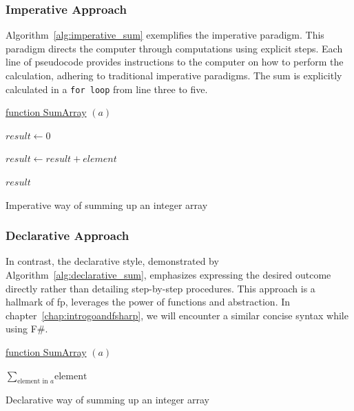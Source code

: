     \subsubsection{Imperative Approach}
    Algorithm\ \ref{alg:imperative_sum} exemplifies the imperative paradigm. This paradigm directs the computer through computations using explicit steps. Each line of pseudocode provides instructions to the computer on how to perform the calculation, adhering to traditional imperative paradigms. The sum is explicitly calculated in a \texttt{for loop} from line three to five.

\begin{algorithm}

    \underline{function SumArray} $(a)$\;
    
    \BlankLine
    $result \leftarrow 0$
    
    {
        $result \leftarrow result + element$
    }
    
    \Return $result$
    
    \caption{Imperative way of summing up an integer array}\label{alg:imperative_sum}
\end{algorithm}

\subsubsection{Declarative Approach}

In contrast, the declarative style, demonstrated by Algorithm\ \ref{alg:declarative_sum}, emphasizes expressing the desired outcome directly rather than detailing step-by-step procedures. This approach is a hallmark of \ac{fp}, leverages the power of functions and abstraction. In chapter\ \ref{chap:introgoandfsharp}, we will encounter a similar concise syntax while using F\#.

\begin{algorithm}

    \underline{function SumArray} $(a)$\;
    
    \BlankLine
    \Return $\sum_{\text{element in } a} \text{element}$
    
    \caption{Declarative way of summing up an integer array}
    \label{alg:declarative_sum}
\end{algorithm}


